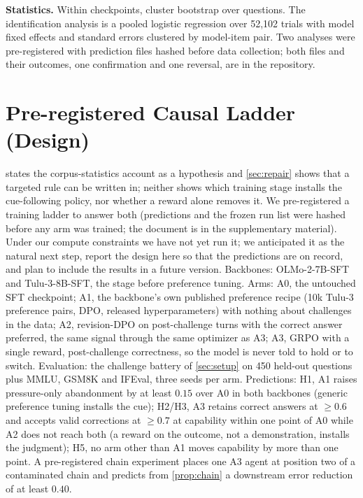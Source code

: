 \documentclass{article}
\begin{document}
\textbf{Statistics.} Within checkpoints, cluster bootstrap over questions. The identification analysis is a pooled logistic regression over 52{,}102 trials with model fixed effects and standard errors clustered by model-item pair. Two analyses were pre-registered with prediction files hashed before data collection; both files and their outcomes, one confirmation and one reversal, are in the repository.


\section{Pre-registered Causal Ladder (Design)}
\label{app:ladder}
 states the corpus-statistics account as a hypothesis and \cref{sec:repair} shows that a targeted rule can be written in; neither shows which training stage installs the cue-following policy, nor whether a reward alone removes it. We pre-registered a training ladder to answer both (predictions and the frozen run list were hashed before any arm was trained; the document is in the supplementary material). Under our compute constraints we have not yet run it; we anticipated it as the natural next step, report the design here so that the predictions are on record, and plan to include the results in a future version. Backbones: OLMo-2-7B-SFT and Tulu-3-8B-SFT, the stage before preference tuning. Arms: A0, the untouched SFT checkpoint; A1, the backbone's own published preference recipe (10k Tulu-3 preference pairs, DPO, released hyperparameters) with nothing about challenges in the data; A2, revision-DPO on post-challenge turns with the correct answer preferred, the same signal through the same optimizer as A3; A3, GRPO with a single reward, post-challenge correctness, so the model is never told to hold or to switch. Evaluation: the challenge battery of \cref{sec:setup} on 450 held-out questions plus MMLU, GSM8K and IFEval, three seeds per arm. Predictions: H1, A1 raises pressure-only abandonment by at least $0.15$ over A0 in both backbones (generic preference tuning installs the cue); H2/H3, A3 retains correct answers at $\geq 0.6$ and accepts valid corrections at $\geq 0.7$ at capability within one point of A0 while A2 does not reach both (a reward on the outcome, not a demonstration, installs the judgment); H5, no arm other than A1 moves capability by more than one point. A pre-registered chain experiment places one A3 agent at position two of a contaminated chain and predicts from \cref{prop:chain} a downstream error reduction of at least $0.40$.
\end{document}
